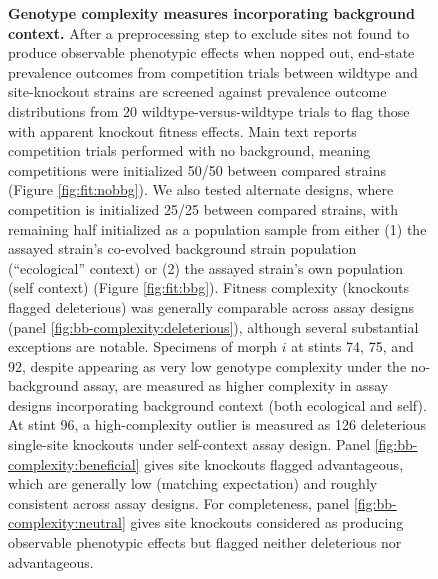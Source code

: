 \begin{figure}
\caption{%
\textbf{Genotype complexity measures incorporating background context.}
\footnotesize
After a preprocessing step to exclude sites not found to produce observable phenotypic effects when nopped out, end-state prevalence outcomes from competition trials between wildtype and site-knockout strains are screened against prevalence outcome distributions from 20 wildtype-versus-wildtype trials to flag those with apparent knockout fitness effects.
Main text reports competition trials performed with no background, meaning competitions were initialized 50/50 between compared strains (Figure \ref{fig:fit:nobbg}).
We also tested alternate designs, where competition is initialized 25/25 between compared strains, with remaining half initialized as a population sample from either (1) the assayed strain's co-evolved background strain population (``ecological'' context) or (2) the assayed strain's own population (self context) (Figure \ref{fig:fit:bbg}).
Fitness complexity (knockouts flagged deleterious) was generally comparable across assay designs (panel \ref{fig:bb-complexity:deleterious}), although several substantial exceptions are notable.
Specimens of morph $i$ at stints 74, 75, and 92, despite appearing as very low genotype complexity under the no-background assay, are measured as higher complexity in assay designs incorporating background context (both ecological and self).
At stint 96, a high-complexity outlier is measured as 126 deleterious single-site knockouts under self-context assay design.
Panel \ref{fig:bb-complexity:beneficial} gives site knockouts flagged advantageous, which are generally low (matching expectation) and roughly consistent across assay designs.
For completeness, panel \ref{fig:bb-complexity:neutral} gives site knockouts considered as producing observable phenotypic effects but flagged neither deleterious nor advantageous.
}
\label{fig:bb-complexity}

\end{figure}
